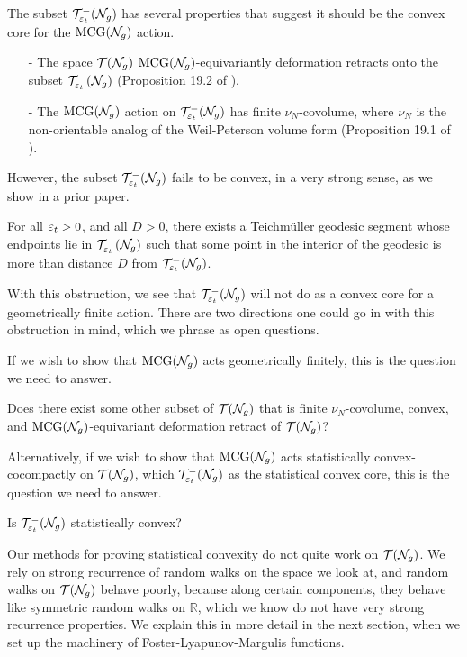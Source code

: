 \documentclass[12pt, reqno]{amsart}
\begin{document}
The subset $\mathcal{T}_{\varepsilon_t}^{-}(\mathcal{N}_g)$ has several properties that suggest it should be the convex core for the $\mathrm{MCG}(\mathcal{N}_g)$ action.
\begin{itemize}
\item[-] The space $\mathcal{T}(\mathcal{N}_g)$ $\mathrm{MCG}(\mathcal{N}_g)$-equivariantly deformation retracts onto the subset $\mathcal{T}_{\varepsilon_t}^{-}(\mathcal{N}_g)$ (Proposition 19.2 of \cite{gendulphe2017whats}).
\item[-] The $\mathrm{MCG}(\mathcal{N}_g)$ action on $\mathcal{T}_{\varepsilon_t}^{-}(\mathcal{N}_g)$ has finite $\nu_N$-covolume, where $\nu_N$ is the non-orientable analog of the Weil-Peterson volume form (Proposition 19.1 of \cite{gendulphe2017whats}).
\end{itemize}

However, the subset $\mathcal{T}_{\varepsilon_t}^{-}(\mathcal{N}_g)$ fails to be convex, in a very strong sense, as we show in a prior paper.
\begin{theorem}
  For all $\varepsilon_t > 0$, and all $D > 0$, there exists a Teichmüller geodesic segment whose endpoints lie in $\mathcal{T}_{\varepsilon_t}^{-}(\mathcal{N}_g)$ such that some point in the interior of the geodesic is more than distance $D$ from $\mathcal{T}_{\varepsilon_t}^{-}(\mathcal{N}_g)$.
\end{theorem}

With this obstruction, we see that $\mathcal{T}_{\varepsilon_t}^{-}(\mathcal{N}_g)$ will not do as a convex core for a geometrically finite action.
There are two directions one could go in with this obstruction in mind, which we phrase as open questions.

If we wish to show that $\mathrm{MCG}(\mathcal{N}_g)$ acts geometrically finitely, this is the question we need to answer.
\begin{question}
  \label{ques:geom-finite-core}
  Does there exist some other subset of $\mathcal{T}(\mathcal{N}_g)$ that is finite $\nu_N$-covolume, convex, and $\mathrm{MCG}(\mathcal{N}_g)$-equivariant deformation retract of $\mathcal{T}(\mathcal{N}_g)$?
\end{question}

Alternatively, if we wish to show that $\mathrm{MCG}(\mathcal{N}_g)$ acts statistically convex-cocompactly on $\mathcal{T}(\mathcal{N}_g)$, which $\mathcal{T}_{\varepsilon_t}^{-}(\mathcal{N}_g)$ as the statistical convex core, this is the question we need to answer.

\begin{question}
  \label{ques:full-stat-core}
  Is $\mathcal{T}_{\varepsilon_t}^{-}(\mathcal{N}_g)$ statistically convex?
\end{question}

Our methods for proving statistical convexity do not quite work on $\mathcal{T}(\mathcal{N}_g)$.
We rely on strong recurrence of random walks on the space we look at, and random walks on $\mathcal{T}(\mathcal{N}_g)$ behave poorly, because along certain components, they behave like symmetric random walks on $\mathbb{R}$, which we know do not have very strong recurrence properties.
We explain this in more detail in the next section, when we set up the machinery of Foster-Lyapunov-Margulis functions.
\end{document}
